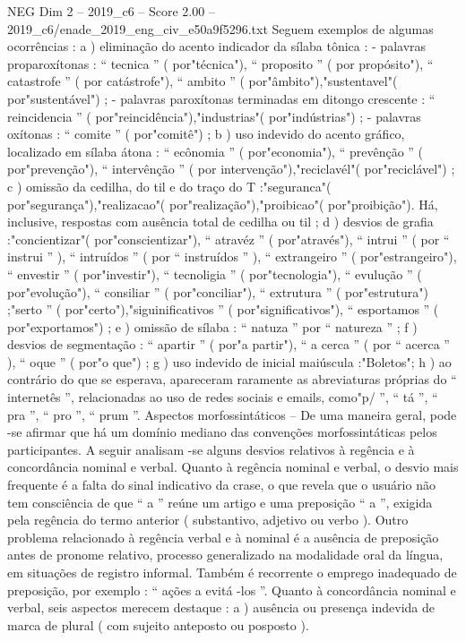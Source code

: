 \begin{textsample}{NEG Dim 2 – 2019\_c6 – Score 2.00 – 2019\_c6/enade\_2019\_eng\_civ\_e50a9f5296.txt}
Seguem exemplos de algumas ocorrências : a ) eliminação do acento indicador da sílaba tônica : - palavras proparoxítonas : “ tecnica ” ( por"técnica"), “ proposito ” ( por propósito"), “ catastrofe ” ( por catástrofe"), “ ambito ” ( por"âmbito"),"sustentavel"( por"sustentável") ; - palavras paroxítonas terminadas em ditongo crescente : “ reincidencia ” ( por"reincidência"),"industrias"( por"indústrias") ; - palavras oxítonas : “ comite ” ( por"comitê") ; b ) uso indevido do acento gráfico, localizado em sílaba átona : “ ecônomia ” ( por"economia"), “ prevênção ” ( por"prevenção"), “ intervênção ” ( por intervenção"),"reciclavél"( por"reciclável") ; c ) omissão da cedilha, do til e do traço do T :"seguranca"( por"segurança"),"realizacao"( por"realização"),"proibicao"( por"proibição").
Há, inclusive, respostas com ausência total de cedilha ou til ; d ) desvios de grafia :"concientizar"( por"conscientizar"), “ atravéz ” ( por"através"), “ intrui ” ( por “ instrui ” ), “ intruídos ” ( por “ instruídos ” ), “ extrangeiro ” ( por"estrangeiro"), “ envestir ” ( por"investir"), “ tecnoligia ” ( por"tecnologia"), “ evulução ” ( por"evolução"), “ consiliar ” ( por"conciliar"), “ extrutura ” ( por"estrutura") ;"serto ” ( por"certo"),"siguinificativos ” ( por"significativos"), “ esportamos ” ( por"exportamos") ; e ) omissão de sílaba : “ natuza ” por “ natureza ” ; f ) desvios de segmentação : “ apartir ” ( por"a partir"), “ a cerca ” ( por “ acerca ” ), “ oque ” ( por"o que") ; g ) uso indevido de inicial maiúscula :"Boletos"; h ) ao contrário do que se esperava, apareceram raramente as abreviaturas próprias do “ internetês ”, relacionadas ao uso de redes sociais e emails, como"p/ ”, “ tá ”, “ pra ”, “ pro ”, “ prum ”.
Aspectos morfossintáticos – De uma maneira geral, pode -se afirmar que há um domínio mediano das convenções morfossintáticas pelos participantes.
A seguir analisam -se alguns desvios relativos à regência e à concordância nominal e verbal.
Quanto à regência nominal e verbal, o desvio mais frequente é a falta do sinal indicativo da crase, o que revela que o usuário não tem consciência de que “ a ” reúne um artigo e uma preposição “ a ”, exigida pela regência do termo anterior ( substantivo, adjetivo ou verbo ).
Outro problema relacionado à regência verbal e à nominal é a ausência de preposição antes de pronome relativo, processo generalizado na modalidade oral da língua, em situações de registro informal.
Também é recorrente o emprego inadequado de preposição, por exemplo : “ ações a evitá -los ”.
Quanto à concordância nominal e verbal, seis aspectos merecem destaque : a ) ausência ou presença indevida de marca de plural ( com sujeito anteposto ou posposto ).

\end{textsample}
